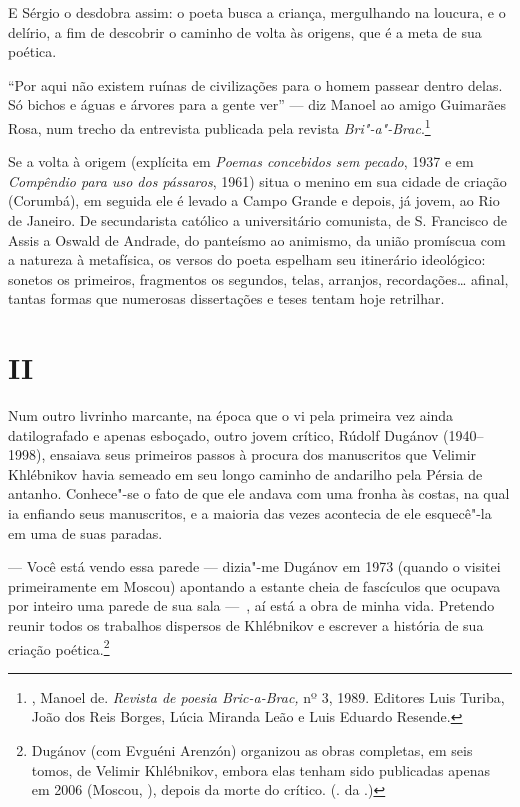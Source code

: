 E Sérgio o desdobra assim: o poeta busca a criança, mergulhando na
loucura, e o delírio, a fim de descobrir o caminho de volta às origens,
que é a meta de sua poética.

``Por aqui não existem ruínas de civilizações para o homem passear
dentro delas. Só bichos e águas e árvores para a gente ver'' --- diz
Manoel ao amigo Guimarães Rosa, num trecho da entrevista publicada pela
revista \emph{Bri"-a"-Brac}.\footnote{, Manoel de. \emph{Revista de
  poesia Bric-a-Brac,} nº 3, 1989. Editores Luis Turiba, João dos Reis
  Borges, Lúcia Miranda Leão e Luis Eduardo Resende.}

Se a volta à origem (explícita em \emph{Poemas concebidos sem pecado}, 1937 e em \emph{Compêndio para uso dos pássaros}, 1961) situa o menino
em sua cidade de criação (Corumbá), em seguida ele é levado a Campo
Grande e depois, já jovem, ao Rio de Janeiro. De secundarista católico a
universitário comunista, de S. Francisco de Assis a Oswald de Andrade,
do panteísmo ao animismo, da união promíscua com a natureza à
metafísica, os versos do poeta espelham seu itinerário ideológico:
sonetos os primeiros, fragmentos os segundos, telas, arranjos,
recordações\ldots{} afinal, tantas formas que numerosas dissertações e teses
tentam hoje retrilhar.

\section{\uppercase{II}}

Num outro livrinho marcante, na época que o vi pela primeira vez ainda datilografado e apenas
esboçado, outro jovem crítico, Rúdolf Dugánov (1940--1998), ensaiava seus primeiros
passos à procura dos manuscritos que Velimir Khlébnikov
havia semeado em seu longo caminho de andarilho pela Pérsia de
antanho. Conhece"-se o fato de que ele andava com uma fronha às costas, na
qual ia enfiando seus manuscritos, e a maioria das vezes acontecia de
ele esquecê"-la em uma de suas paradas.

--- Você está vendo essa parede --- dizia"-me Dugánov em 1973 (quando o visitei
primeiramente em Moscou) apontando a estante cheia de fascículos que
ocupava por inteiro uma parede de sua sala ---~, aí está a obra
de minha vida. Pretendo reunir todos os trabalhos dispersos de Khlébnikov
e escrever a história de sua criação poética.\footnote{Dugánov (com
  Evguéni Arenzón) organizou as obras completas, em seis tomos, de
  Velimir Khlébnikov, embora elas tenham sido publicadas apenas em 2006
  (Moscou, ), depois da morte do crítico. (. da .)}


